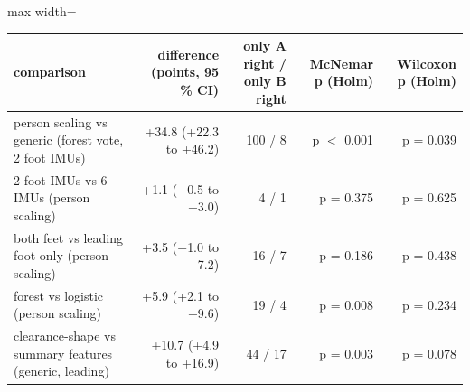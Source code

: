\begin{adjustbox}{max width=\textwidth}
{\footnotesize
\begin{tabular}{p{5.4cm}rrrr}
\toprule
\textbf{comparison} & \textbf{difference (points, 95 \% CI)} & \textbf{only A right / only B right} & \textbf{McNemar p (Holm)} & \textbf{Wilcoxon p (Holm)} \\
\midrule
person scaling vs generic (forest vote, 2 foot IMUs) & +34.8 (+22.3 to +46.2) & 100 / 8 & p $<$ 0.001 & p = 0.039 \\
2 foot IMUs vs 6 IMUs (person scaling) & +1.1 ($-$0.5 to +3.0) & 4 / 1 & p = 0.375 & p = 0.625 \\
both feet vs leading foot only (person scaling) & +3.5 ($-$1.0 to +7.2) & 16 / 7 & p = 0.186 & p = 0.438 \\
forest vs logistic (person scaling) & +5.9 (+2.1 to +9.6) & 19 / 4 & p = 0.008 & p = 0.234 \\
clearance-shape vs summary features (generic, leading) & +10.7 (+4.9 to +16.9) & 44 / 17 & p = 0.003 & p = 0.078 \\
\bottomrule
\end{tabular}
}
\end{adjustbox}
